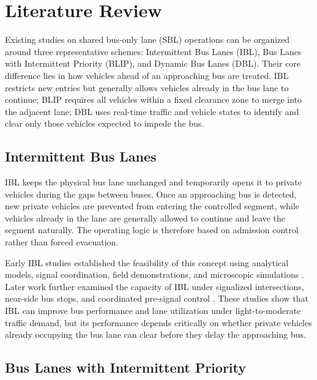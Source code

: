 
\section{Literature Review}

Existing studies on shared bus-only lane (SBL) operations can be organized around three representative schemes: Intermittent Bus Lanes (IBL), Bus Lanes with Intermittent Priority (BLIP), and Dynamic Bus Lanes (DBL). Their core difference lies in how vehicles ahead of an approaching bus are treated. IBL restricts new entries but generally allows vehicles already in the bus lane to continue; BLIP requires all vehicles within a fixed clearance zone to merge into the adjacent lane; DBL uses real-time traffic and vehicle states to identify and clear only those vehicles expected to impede the bus.

\subsection{Intermittent Bus Lanes}

IBL keeps the physical bus lane unchanged and temporarily opens it to private vehicles during the gaps between buses. Once an approaching bus is detected, new private vehicles are prevented from entering the controlled segment, while vehicles already in the lane are generally allowed to continue and leave the segment naturally. The operating logic is therefore based on admission control rather than forced evacuation.

Early IBL studies established the feasibility of this concept using analytical models, signal coordination, field demonstrations, and microscopic simulations \citep[e.g.,][]{viegas2001widening,viegas2007intermittent,currie2008intermittent,zhu2010numerical}. Later work further examined the capacity of IBL under signalized intersections, near-side bus stops, and coordinated pre-signal control \citep[e.g.,][]{lin2022capability,xie2023modelling,zhao2023setting}. These studies show that IBL can improve bus performance and lane utilization under light-to-moderate traffic demand, but its performance depends critically on whether private vehicles already occupying the bus lane can clear before they delay the approaching bus.

\subsection{Bus Lanes with Intermittent Priority}

